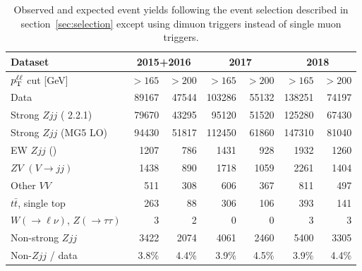 \begin{table}[h]
  \centering
  \begin{tabular}{l|r|r|r|r|r|r|}\hline\hline
    Dataset   & \multicolumn{2}{c|}{2015+2016} & \multicolumn{2}{c|}{2017} & \multicolumn{2}{c|}{2018}\\ \hline
    $p_\mathrm{T}^{\ell\ell}$ cut [GeV] & $> 165$ & $> 200$ & $> 165$ & $ > 200$ & $> 165$ & $> 200$ \\ \hline\hline
    Data                            &  89167 &  47544 &  103286 &  55132 & 138251 & 74197 \\ \hline
    Strong $Zjj$ (\sherpa{} 2.2.1)  &  79670 &  43295 &   95120 &  51520 & 125280 & 67430 \\ 
    Strong $Zjj$ (MG5 LO)           &  94430 &  51817 &  112450 &  61860 & 147310 & 81040 \\ \hline
    EW $Zjj$ (\powpy{})             &   1207 &    786 &    1431 &    928 &   1932 &  1260 \\ 
    $ZV$ $(V\to jj)$                &   1438 &    890 &    1718 &   1059 &   2261 &  1404 \\  
    Other $VV$                      &    511 &    308 &     606 &    367 &    811 &   497 \\ 
    $t\bar{t}$, single top          &    263 &     88 &     306 &    106 &    393 &   141 \\ 
    $W(\to\ell\nu)$, $Z(\to\tau\tau)$ &    3 &      2 &       0 &      0 &      3 &     3 \\ \hline
    Non-strong $Zjj$                &  3422  &   2074 &    4061 &   2460 &   5400 &  3305 \\ \hline
    Non-$Zjj$ / data                &  3.8\% &  4.4\% &   3.9\% &  4.5\% &  3.9\% & 4.4\% \\ \hline\hline
    \end{tabular}
    \caption{Observed and expected event yields following the event selection described in section~\ref{sec:selection} except using dimuon triggers instead of single muon triggers.}
    \label{tab:bkgProcesses}
\end{table}

